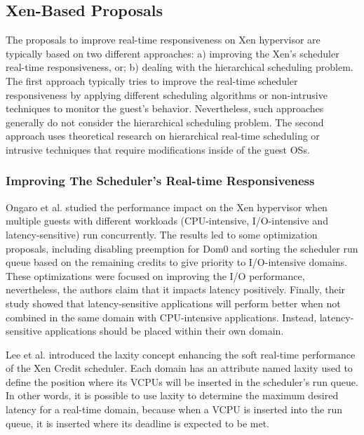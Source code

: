 \subsection{Xen-Based Proposals}
\label{subsubsection:xenproposals}

The proposals to improve real-time responsiveness on Xen hypervisor are typically based on two different approaches: a) improving the Xen's scheduler real-time responsiveness, or; b) dealing with the hierarchical scheduling problem. The first approach typically tries to improve the real-time scheduler responsiveness by applying different scheduling algorithms or non-intrusive techniques to monitor the guest’s behavior. Nevertheless, such approaches generally do not consider the hierarchical scheduling problem. The second approach uses theoretical research on hierarchical real-time scheduling or intrusive techniques that require modifications inside of  the guest OSs.

\subsubsection{Improving The Scheduler's Real-time Responsiveness}

Ongaro et al. \cite{Ongaro2008} studied the performance impact on the Xen hypervisor when multiple guests with different workloads (CPU-intensive, I/O-intensive and latency-sensitive) run concurrently. The results led to some optimization proposals, including disabling preemption for Dom0 and sorting the scheduler run queue based on the remaining credits  to give priority to I/O-intensive domains. These optimizations were focused on improving the I/O performance, nevertheless, the authors claim that it impacts latency positively. Finally, their study showed that latency-sensitive applications will perform better when not combined in the same domain with CPU-intensive applications. Instead, latency-sensitive applications should be placed within their own domain. 

Lee et al. \cite{Lee2010} introduced the laxity concept enhancing the soft real-time performance of the Xen Credit scheduler. Each domain has an attribute named laxity used to define the position where its VCPUs will be inserted in the scheduler's run queue. In other words, it is possible to use laxity to determine the maximum desired latency for a real-time domain, because when a VCPU is inserted into the run queue, it is inserted where its deadline is expected to be met. 


